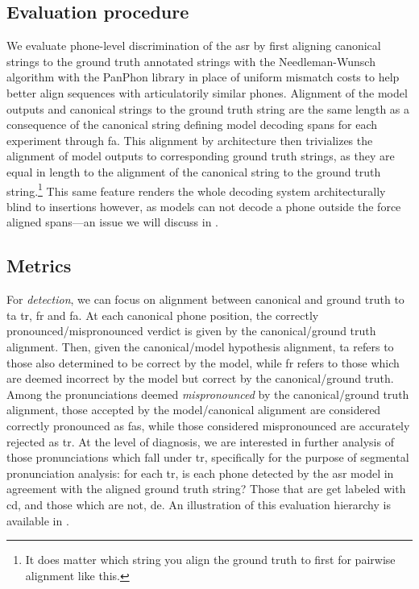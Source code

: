 \documentclass[thesis]{cluu}
\begin{document}
\subsection{Evaluation procedure}
We evaluate phone-level discrimination of the \gls{asr} by first aligning canonical strings to the ground truth annotated strings with the Needleman-Wunsch algorithm \parencite{needlemanGeneralMethodApplicable1970} with the PanPhon \parencite{mortensenPanPhonResourceMapping} library in place of uniform mismatch costs to help better align sequences with articulatorily similar phones. Alignment of the model outputs and canonical strings to the ground truth string are the same length as a consequence of the canonical string defining model decoding spans for each experiment through \gls{fa}. This alignment by architecture then trivializes the alignment of model outputs to corresponding ground truth strings, as they are equal in length to the alignment of the canonical string to the ground truth string.\footnote{It does matter which string you align the ground truth to first for pairwise alignment like this.} This same feature renders the whole decoding system architecturally blind to insertions however, as models can not decode a phone outside the force aligned spans---an issue we will discuss in .

\subsection{Metrics}
For \textit{detection}, we can focus on alignment between canonical and ground truth to  \gls{ta} \gls{tr}, \gls{fr} and \gls{fa}. At each canonical phone position, the correctly pronounced/mispronounced verdict is given by the canonical/ground truth alignment. Then, given the canonical/model hypothesis alignment, \Gls{ta} refers to  those also determined to be correct by the model, while \Gls{fr} refers to those which are deemed incorrect by the model but correct by the canonical/ground truth. Among the pronunciations deemed \textit{mispronounced} by the canonical/ground truth alignment, those accepted by the model/canonical alignment are considered correctly pronounced as \glspl{fa}, while those considered mispronounced are accurately rejected as \Gls{tr}. At the level of diagnosis, we are interested in further analysis of those pronunciations which fall under \gls{tr}, specifically for the purpose of segmental pronunciation analysis: for each \gls{tr}, is each phone detected by the \gls{asr} model in agreement with the aligned ground truth string? Those that are get labeled with \gls{cd}, and those which are not, \gls{de}. An illustration of this evaluation hierarchy is available in .
\end{document}
